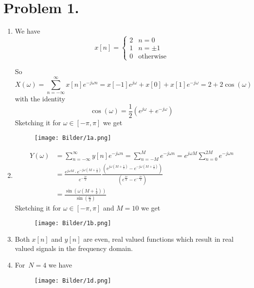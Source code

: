 \documentclass[a4paper,11pt,norsk]{article}
\begin{document}


\section*{Problem 1.}
\begin{enumerate}
    \item We have 
        \[
            x[n] = \begin{cases}
                2 & n = 0 \\
                1 & n = \pm 1 \\
                0 & \text{otherwise}
            \end{cases}
        \]

        So
        \[
            X(\omega) = \sum_{n = -\infty}^{\infty} x[n]e^{-j\omega n} = x[-1]e^{j\omega} + x[0] + x[1]e^{-j\omega} = 2 + 2\cos(\omega)
        \]
        with the identity
        \[
            \cos(\omega) = \frac{1}{2}(e^{j\omega} + e^{-j\omega})
        \]
        Sketching it for $\omega \in [-\pi, \pi]$ we get
        \begin{figure}[H]
            \center
            \texttt{[image: Bilder/1a.png]}
        \end{figure}

    \item 
        \begin{align*}
            Y(\omega) &= \sum_{n=-\infty}^{\infty} y[n]e^{-j\omega n} = \sum_{n=-M}^{M} e^{-j\omega n} = e^{j\omega M} \sum_{n=0}^{2M} e^{-j\omega n} \\
                      &= \frac{e^{j\omega M} \cdot e^{-j\omega\left(M + \frac{1}{2}\right)}}{e^{-\frac{j\omega}{2}}} \frac{\left(e^{j\omega\left(M + \frac{1}{2}\right)} - e^{-j\omega\left(M + \frac{1}{2}\right)}\right)}{\left(e^{\frac{j\omega}{2}} - e^{-\frac{j\omega}{2}}\right)} \\
                      &= \frac{\sin(\omega(M + \frac{1}{2}))}{\sin\left(\frac{\omega}{2}\right)}
        \end{align*}
        Sketching it for $\omega \in [-\pi, \pi]$ and $M = 10$ we get
        \begin{figure}[H]
            \center
            \texttt{[image: Bilder/1b.png]}
        \end{figure}

    \item Both $x[n]$ and $y[n]$ are even, real valued functions which result in real valued signals in the frequency domain.
    \item 
        For $N = 4$ we have
        \begin{figure}[H]
            \center
            \texttt{[image: Bilder/1d.png]}
        \end{figure}


\end{enumerate}
\end{document}
